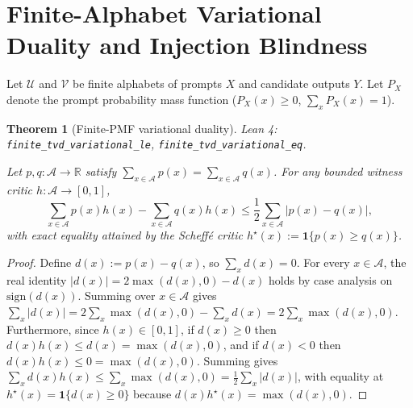 \documentclass[11pt]{article}
\theoremstyle{plain}
\newtheorem{theorem}{Theorem}[section]
\theoremstyle{definition}
\theoremstyle{remark}
\newcommand{\R}{\mathbb{R}}
\newcommand{\lident}[1]{{\small\texttt{#1}}}
\begin{document}
\section{Finite-Alphabet Variational Duality and Injection Blindness}

Let $\mathcal{U}$ and $\mathcal{V}$ be finite alphabets of prompts $X$ and
candidate outputs $Y$. Let $P_X$ denote the prompt probability mass function
($P_X(x) \ge 0$, $\sum_x P_X(x) = 1$).

\begin{theorem}[Finite-PMF variational duality]
\noindent\textit{Lean 4:} \lident{finite\_\allowbreak tvd\_\allowbreak variational\_\allowbreak le},
\lident{finite\_\allowbreak tvd\_\allowbreak variational\_\allowbreak eq}.\par\medskip
Let $p, q : \mathcal{A} \to \R$ satisfy $\sum_{x \in \mathcal{A}} p(x) = \sum_{x \in \mathcal{A}} q(x)$.
For any bounded witness critic $h : \mathcal{A} \to [0,1]$,
\[
  \sum_{x \in \mathcal{A}} p(x)h(x) - \sum_{x \in \mathcal{A}} q(x)h(x)
  \le \frac{1}{2}\sum_{x \in \mathcal{A}} |p(x) - q(x)|,
\]
with exact equality attained by the Scheff\'e critic $h^\star(x) := \mathbf{1}\{p(x) \ge q(x)\}$.
\end{theorem}
\begin{proof}
Define $d(x) := p(x) - q(x)$, so $\sum_x d(x) = 0$. For every $x \in \mathcal{A}$,
the real identity $|d(x)| = 2\max(d(x), 0) - d(x)$ holds by case analysis on
$\mathrm{sign}(d(x))$. Summing over $x \in \mathcal{A}$ gives
$\sum_x |d(x)| = 2\sum_x \max(d(x),0) - \sum_x d(x) = 2\sum_x \max(d(x),0)$.
Furthermore, since $h(x) \in [0,1]$, if $d(x) \ge 0$ then $d(x)h(x) \le d(x) = \max(d(x),0)$,
and if $d(x) < 0$ then $d(x)h(x) \le 0 = \max(d(x),0)$. Summing gives
$\sum_x d(x)h(x) \le \sum_x \max(d(x),0) = \frac{1}{2}\sum_x |d(x)|$, with
equality at $h^\star(x) = \mathbf{1}\{d(x) \ge 0\}$ because $d(x)h^\star(x) = \max(d(x),0)$.
\end{proof}
\end{document}
